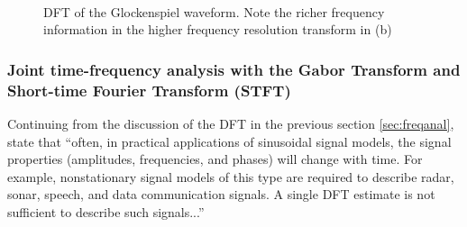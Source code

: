 \documentclass[report.tex]{subfiles}
\begin{document}
\begin{figure}[ht]
	\centering
	\\
	\caption{DFT of the Glockenspiel waveform. Note the richer frequency information in the higher frequency resolution transform in (b)}
	\label{fig:glockdft}
\end{figure}

\newpagefill

\subsubsection{Joint time-frequency analysis with the Gabor Transform and Short-time Fourier Transform (STFT)}
\label{sec:jointtfa}

Continuing from the discussion of the DFT in the previous section \ref{sec:freqanal}, \textcite[Chapter~10]{discretebook} state that ``often, in practical applications of sinusoidal signal models, the signal properties (amplitudes, frequencies, and phases) will change with time. For example, nonstationary signal models of this type are required to describe radar, sonar, speech, and data communication signals. A single DFT estimate is not sufficient to describe such signals...''
\end{document}
